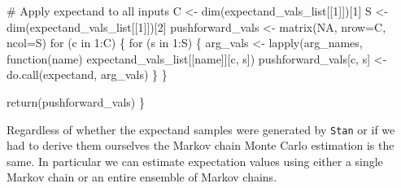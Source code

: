 \documentclass[
  letterpaper,
  DIV=11,
  numbers=noendperiod]{scrartcl}
\newenvironment{Shaded}{\begin{snugshade}}{\end{snugshade}}
\newcommand{\CommentTok}[1]{\textcolor[rgb]{0.37,0.37,0.37}{#1}}
\newcommand{\ControlFlowTok}[1]{\textcolor[rgb]{0.00,0.23,0.31}{#1}}
\newcommand{\DecValTok}[1]{\textcolor[rgb]{0.68,0.00,0.00}{#1}}
\newcommand{\KeywordTok}[1]{\textcolor[rgb]{0.00,0.23,0.31}{#1}}
\newcommand{\NormalTok}[1]{\textcolor[rgb]{0.00,0.23,0.31}{#1}}
\newcommand{\OperatorTok}[1]{\textcolor[rgb]{0.37,0.37,0.37}{#1}}
\begin{document}
\begin{Shaded}
\begin{Highlighting}[]
  \CommentTok{\# Apply expectand to all inputs}
\NormalTok{  C }\OperatorTok{\textless{}{-}}\NormalTok{ dim(expectand\_vals\_list[[}\DecValTok{1}\NormalTok{]])[}\DecValTok{1}\NormalTok{]}
\NormalTok{  S }\OperatorTok{\textless{}{-}}\NormalTok{ dim(expectand\_vals\_list[[}\DecValTok{1}\NormalTok{]])[}\DecValTok{2}\NormalTok{]}
\NormalTok{  pushforward\_vals }\OperatorTok{\textless{}{-}}\NormalTok{ matrix(NA, nrow}\OperatorTok{=}\NormalTok{C, ncol}\OperatorTok{=}\NormalTok{S)}
  \ControlFlowTok{for}\NormalTok{ (c }\KeywordTok{in} \DecValTok{1}\NormalTok{:C) \{}
    \ControlFlowTok{for}\NormalTok{ (s }\KeywordTok{in} \DecValTok{1}\NormalTok{:S) \{}
\NormalTok{      arg\_vals }\OperatorTok{\textless{}{-}}\NormalTok{ lapply(arg\_names,}
\NormalTok{                         function(name)}
\NormalTok{                         expectand\_vals\_list[[name]][c, s])}
\NormalTok{      pushforward\_vals[c, s] }\OperatorTok{\textless{}{-}}\NormalTok{ do.call(expectand, arg\_vals)}
\NormalTok{    \}}
\NormalTok{  \}}

  \ControlFlowTok{return}\NormalTok{(pushforward\_vals)}
\NormalTok{\}}
\end{Highlighting}
\end{Shaded}

Regardless of whether the expectand samples were generated by
\texttt{Stan} or if we had to derive them ourselves the Markov chain
Monte Carlo estimation is the same. In particular we can estimate
expectation values using either a single Markov chain or an entire
ensemble of Markov chains.
\end{document}
